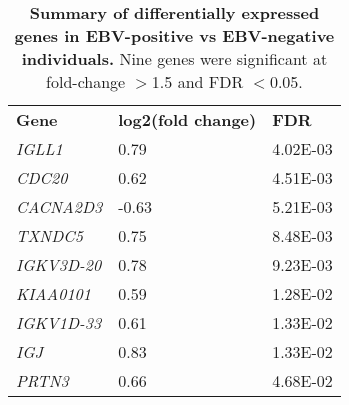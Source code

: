 \begin{table}[]
\begin{center}
\begin{tabular}{lll}
\textbf{Gene}      & \textbf{log2(fold change)} & \textbf{FDR} \\
\textit{IGLL1}     & 0.79                       & 4.02E-03     \\
\textit{CDC20}     & 0.62                       & 4.51E-03     \\
\textit{CACNA2D3}  & -0.63                      & 5.21E-03     \\
\textit{TXNDC5}    & 0.75                       & 8.48E-03     \\
\textit{IGKV3D-20} & 0.78                       & 9.23E-03     \\
\textit{KIAA0101}  & 0.59                       & 1.28E-02     \\
\textit{IGKV1D-33} & 0.61                       & 1.33E-02     \\
\textit{IGJ}       & 0.83                       & 1.33E-02     \\
\textit{PRTN3}     & 0.66                       & 4.68E-02    
\end{tabular}
\end{center}
\caption[Differentially expressed genes in EBV reactivation]{\textbf{Summary of differentially expressed genes in EBV-positive vs EBV-negative individuals.} Nine genes were significant at fold-change $>$1.5 and FDR $<$0.05.} 
\label{tab:ebv-de-genes}
\end{table}

